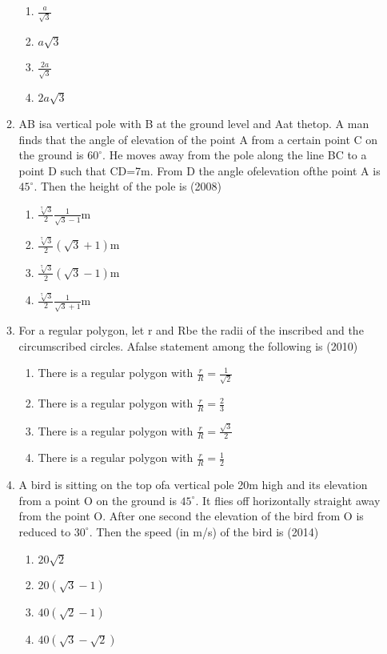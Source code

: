 \documentclass[12pt]{article}
\begin{document}
\begin{enumerate}
\begin{enumerate}
\begin{enumerate}
\item $\frac{a}{\sqrt{3}}$
\item $a\sqrt{3}$
\item $\frac{2a}{\sqrt{3}}$
\item $2a\sqrt{3}$
\end{enumerate}
\item AB isa vertical pole with B at the ground level and Aat thetop. A man finds that the angle of elevation of the point A from a certain point C on the ground is $60^\circ$. He moves away from the pole along the line BC to a point D such that CD=7m. From D the angle ofelevation ofthe point A is $45^\circ$. Then the height of the pole is (2008)
\begin{enumerate}
\item $\frac{\sqrt[7]{3}}{2}\frac{1}{\sqrt{3}-1}$m
\item $\frac{\sqrt[7]{3}}{2}(\sqrt{3}+1)$m
\item $\frac{\sqrt[7]{3}}{2}(\sqrt{3}-1)$m
\item $\frac{\sqrt[7]{3}}{2}\frac{1}{\sqrt{3}+1}$m
\end{enumerate}
\item For a regular polygon, let r and Rbe the radii of the inscribed and the circumscribed circles. Afalse statement among the following is (2010)
\begin{enumerate}
\item There is a regular polygon with $\frac{r}{R}=\frac{1}{\sqrt{2}}$
\item There is a regular polygon with $\frac{r}{R}=\frac{2}{3}$
\item There is a regular polygon with $\frac{r}{R}=\frac{\sqrt{3}}{2}$
\item There is a regular polygon with $\frac{r}{R}=\frac{1}{2}$
\end{enumerate}
\item A bird is sitting on the top ofa vertical pole 20m high and its elevation from a point O on the ground is $45^\circ$. It flies off horizontally straight away from the point O. After one second the elevation of the bird from O is reduced to $30^\circ$. Then the speed (in m/s) of the bird is (2014)
\begin{enumerate}
\item $20\sqrt{2}$
\item $20(\sqrt{3}-1)$
\item $40(\sqrt{2}-1)$
\item $40(\sqrt{3}-\sqrt{2})$
\end{enumerate}

\end{enumerate}
\end{enumerate}
\end{document}
